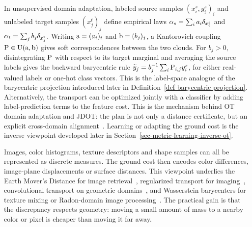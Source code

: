 \begin{example}\label{ex-domain-adaptation}
	In unsupervised domain adaptation, labeled source samples \((x_i^s,y_i^s)_i\) and unlabeled target samples \((x_j^t)_j\) define empirical laws $\al_s=\sum_i a_i\de_{x_i^s}$ and $\al_t=\sum_j b_j\de_{x_j^t}$.
	Writing \(\a=(a_i)_i\) and \(\b=(b_j)_j\), a Kantorovich coupling \(\P\in\CouplingsD(\a,\b)\) gives soft correspondences between the two clouds. For $b_j>0$, disintegrating $\P$ with respect to its target marginal and averaging the source labels gives the backward barycentric rule $\widetilde y_j=b_j^{-1}\sum_i \P_{i,j}y_i^s$, for either real-valued labels or one-hot class vectors. This is the label-space analogue of the barycentric projection introduced later in Definition~\ref{def-barycentric-projection}. Alternatively, the transport can be optimized jointly with a classifier by adding label-prediction terms to the feature cost. This is the mechanism behind OT domain adaptation and JDOT: the plan is not only a distance certificate, but an explicit cross-domain alignment~\cite{courty2017optimal,courty2017joint}. Learning or adapting the ground cost is the inverse viewpoint developed later in Section~\ref{sec-metric-learning-inverse-ot}.
\end{example}

\begin{example}\label{ex-visual-distributions}
	Images, color histograms, texture descriptors and shape samples can all be represented as discrete measures. The ground cost then encodes color differences, image-plane displacements or surface distances. This viewpoint underlies the Earth Mover's Distance for image retrieval~\cite{RubTomGui00}, regularized transport for imaging~\cite{2014-xia-siims}, convolutional transport on geometric domains~\cite{2015-solomon-siggraph}, and Wasserstein barycenters for texture mixing or Radon-domain image processing~\cite{2013-Bonneel-barycenter,bonneel2023survey}. The practical gain is that the discrepancy respects geometry: moving a small amount of mass to a nearby color or pixel is cheaper than moving it far away.
\end{example}


